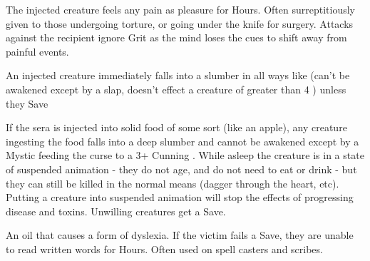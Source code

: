  The injected creature feels any pain as pleasure for Hours.  Often surreptitiously given to those undergoing torture, or going under the knife for surgery.  Attacks against the recipient ignore Grit as the mind loses the cues to shift away from painful events.  


  \CHYMISTRY[
    Name=Grimm's Stupurous Preparation,
    Link=chymistry-grimms-stupurous-preparation,
    Cost=Gold (5 Research;500\AU),
    Duration=0 ,
    Toxin=Yes,
    Narcotic=No 
  ]


  An injected creature immediately falls into a slumber in all ways like  (can't be awakened except by a slap, doesn't effect a creature of greater than 4 \HD) unless they Save

  If the sera is injected into solid food of some sort (like an apple), any creature ingesting the food falls into a deep slumber and cannot be awakened except by a Mystic feeding the curse to a 3+ Cunning . While asleep the creature is in a state of suspended animation - they do not age, and do not need to eat or drink - but they can still be killed in the normal means (dagger through the heart, etc).  Putting a creature into suspended animation will stop the effects of progressing disease and toxins.  Unwilling creatures get a Save. 

  \CHYMISTRY[
    Name=Wordwarp,
    Link=chymistry-wordwarp,
    Cost=Gold (5 Research;500\AU),
    Duration=0 ,
    Toxin=Yes,
    Narcotic=No 
  ]

  An oil that causes a form of dyslexia.  If the victim fails a Save, they are unable to read written words for Hours.  Often used on spell casters and scribes.


\newpage

